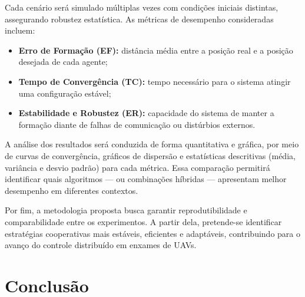 \documentclass[portuguese]{sbcreviews-2025}%
\begin{document}
Cada cenário será simulado múltiplas vezes com condições iniciais distintas, assegurando robustez estatística. As métricas de desempenho consideradas incluem:

\begin{itemize}
    \item \textbf{Erro de Formação (EF):} distância média entre a posição real e a posição desejada de cada agente;
    \item \textbf{Tempo de Convergência (TC):} tempo necessário para o sistema atingir uma configuração estável;
    \item \textbf{Estabilidade e Robustez (ER):} capacidade do sistema de manter a formação diante de falhas de comunicação ou distúrbios externos.
\end{itemize}

A análise dos resultados será conduzida de forma quantitativa e gráfica, por meio de curvas de convergência, gráficos de dispersão e estatísticas descritivas (média, variância e desvio padrão) para cada métrica. Essa comparação permitirá identificar quais algoritmos — ou combinações híbridas — apresentam melhor desempenho em diferentes contextos.

Por fim, a metodologia proposta busca garantir reprodutibilidade e comparabilidade entre os experimentos. A partir dela, pretende-se identificar estratégias cooperativas mais estáveis, eficientes e adaptáveis, contribuindo para o avanço do controle distribuído em enxames de UAVs.


\section{Conclusão}
\end{document}
